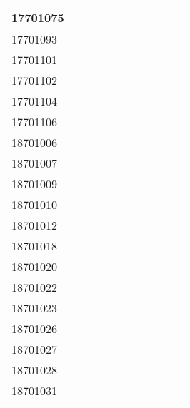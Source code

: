 \documentclass[12pt]{article}
\begin{document}
\begin{center}
\begin{small}
\begin{tabular}{|l|c|c|c|c|c|c|c|c|c|c|}
17701075 &  &  &  &  &  &  &  &  & \\ \hline 
17701093 &  &  &  &  &  &  &  &  & \\ \hline 
17701101 &  &  &  &  &  &  &  &  & \\ \hline 
17701102 &  &  &  &  &  &  &  &  & \\ \hline 
17701104 &  &  &  &  &  &  &  &  & \\ \hline 
17701106 &  &  &  &  &  &  &  &  & \\ \hline 
18701006 &  &  &  &  &  &  &  &  & \\ \hline 
18701007 &  &  &  &  &  &  &  &  & \\ \hline 
18701009 &  &  &  &  &  &  &  &  & \\ \hline 
18701010 &  &  &  &  &  &  &  &  & \\ \hline 
18701012 &  &  &  &  &  &  &  &  & \\ \hline 
18701018 &  &  &  &  &  &  &  &  & \\ \hline 
18701020 &  &  &  &  &  &  &  &  & \\ \hline 
18701022 &  &  &  &  &  &  &  &  & \\ \hline 
18701023 &  &  &  &  &  &  &  &  & \\ \hline 
18701026 &  &  &  &  &  &  &  &  & \\ \hline 
18701027 &  &  &  &  &  &  &  &  & \\ \hline 
18701028 &  &  &  &  &  &  &  &  & \\ \hline 
18701031 &  &  &  &  &  &  &  &  & \\ \hline 
        \end{tabular}
            \end{small}
            \end{center}
  \centering
            
\end{document}
